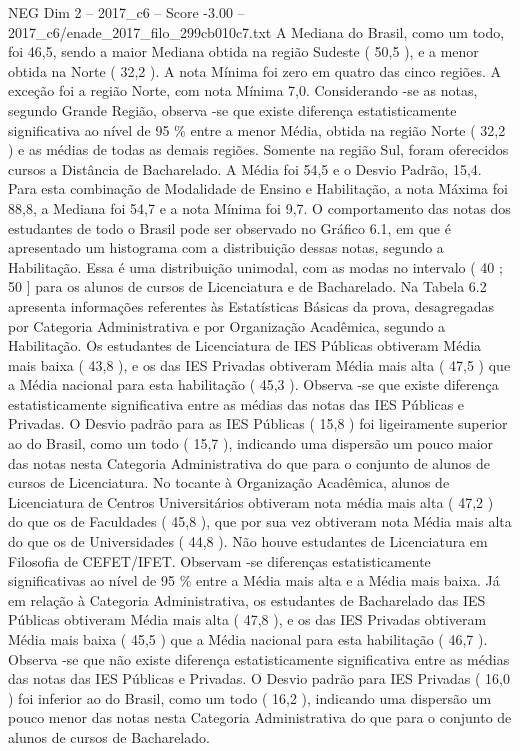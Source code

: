 \begin{textsample}{NEG Dim 2 – 2017\_c6 – Score -3.00 – 2017\_c6/enade\_2017\_filo\_299cb010c7.txt}
A Mediana do Brasil, como um todo, foi 46,5, sendo a maior Mediana obtida na região Sudeste ( 50,5 ), e a menor obtida na Norte ( 32,2 ).
A nota Mínima foi zero em quatro das cinco regiões.
A exceção foi a região Norte, com nota Mínima 7,0.
Considerando -se as notas, segundo Grande Região, observa -se que existe diferença estatisticamente significativa ao nível de 95 \% entre a menor Média, obtida na região Norte ( 32,2 ) e as médias de todas as demais regiões.
Somente na região Sul, foram oferecidos cursos a Distância de Bacharelado.
A Média foi 54,5 e o Desvio Padrão, 15,4.
Para esta combinação de Modalidade de Ensino e Habilitação, a nota Máxima foi 88,8, a Mediana foi 54,7 e a nota Mínima foi 9,7.
O comportamento das notas dos estudantes de todo o Brasil pode ser observado no Gráfico 6.1, em que é apresentado um histograma com a distribuição dessas notas, segundo a Habilitação.
Essa é uma distribuição unimodal, com as modas no intervalo ( 40 ; 50 ] para os alunos de cursos de Licenciatura e de Bacharelado.
Na Tabela 6.2 apresenta informações referentes às Estatísticas Básicas da prova, desagregadas por Categoria Administrativa e por Organização Acadêmica, segundo a Habilitação.
Os estudantes de Licenciatura de IES Públicas obtiveram Média mais baixa ( 43,8 ), e os das IES Privadas obtiveram Média mais alta ( 47,5 ) que a Média nacional para esta habilitação ( 45,3 ).
Observa -se que existe diferença estatisticamente significativa entre as médias das notas das IES Públicas e Privadas.
O Desvio padrão para as IES Públicas ( 15,8 ) foi ligeiramente superior ao do Brasil, como um todo ( 15,7 ), indicando uma dispersão um pouco maior das notas nesta Categoria Administrativa do que para o conjunto de alunos de cursos de Licenciatura.
No tocante à Organização Acadêmica, alunos de Licenciatura de Centros Universitários obtiveram nota média mais alta ( 47,2 ) do que os de Faculdades ( 45,8 ), que por sua vez obtiveram nota Média mais alta do que os de Universidades ( 44,8 ).
Não houve estudantes de Licenciatura em Filosofia de CEFET/IFET.
Observam -se diferenças estatisticamente significativas ao nível de 95 \% entre a Média mais alta e a Média mais baixa.
Já em relação à Categoria Administrativa, os estudantes de Bacharelado das IES Públicas obtiveram Média mais alta ( 47,8 ), e os das IES Privadas obtiveram Média mais baixa ( 45,5 ) que a Média nacional para esta habilitação ( 46,7 ).
Observa -se que não existe diferença estatisticamente significativa entre as médias das notas das IES Públicas e Privadas.
O Desvio padrão para IES Privadas ( 16,0 ) foi inferior ao do Brasil, como um todo ( 16,2 ), indicando uma dispersão um pouco menor das notas nesta Categoria Administrativa do que para o conjunto de alunos de cursos de Bacharelado.

\end{textsample}

